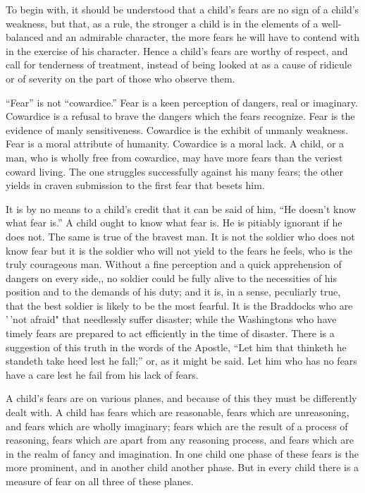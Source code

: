 \documentclass[
]{book}
\begin{document}
To begin with, it should be understood that a child's fears are no sign of a child's weakness, but that, as a rule, the stronger a child is in the elements of a well-balanced and an admirable character, the more fears he will have to contend with in the exercise of his character. Hence a child's fears are worthy of respect, and call for tenderness of treatment, instead of being looked at as a cause of ridicule or of severity on the part of those who observe them.

``Fear'' is not ``cowardice.'' Fear is a keen perception of dangers, real or imaginary. Cowardice is a refusal to brave the dangers which the fears recognize. Fear is the evidence of manly sensitiveness. Cowardice is the exhibit of unmanly weakness. Fear is a moral attribute of humanity. Cowardice is a moral lack. A child, or a man, who is wholly free from cowardice, may have more fears than the veriest coward living. The one struggles successfully against his many fears; the other yields in craven submission to the first fear that besets him.

It is by no means to a child's credit that it can be said of him, ``He doesn't know what fear is.'' A child ought to know what fear is. He is pitiably ignorant if he does not. The same is true of the bravest man. It is not the soldier who does not know fear but it is the soldier who will not yield to the fears he feels, who is the truly courageous man. Without a fine perception and a quick apprehension of dangers on every side,, no soldier could be fully alive to the necessities of his position and to the demands of his duty; and it is, in a sense, peculiarly true, that the best soldier is likely to be the most fearful. It is the Braddocks who are '\,'not afraid" that needlessly suffer disaster; while the Washingtons who have timely fears are prepared to act efficiently in the time of disaster. There is a suggestion of this truth in the words of the Apostle, ``Let him that thinketh he standeth take heed lest he fall;'' or, as it might be said. Let him who has no fears have a care lest he fail from his lack of fears.

A child's fears are on various planes, and because of this they must be differently dealt with. A child has fears which are reasonable, fears which are unreasoning, and fears which are wholly imaginary; fears which are the result of a process of reasoning, fears which are apart from any reasoning process, and fears which are in the realm of fancy and imagination. In one child one phase of these fears is the more prominent, and in another child another phase. But in every child there is a measure of fear on all three of these planes.
\end{document}
